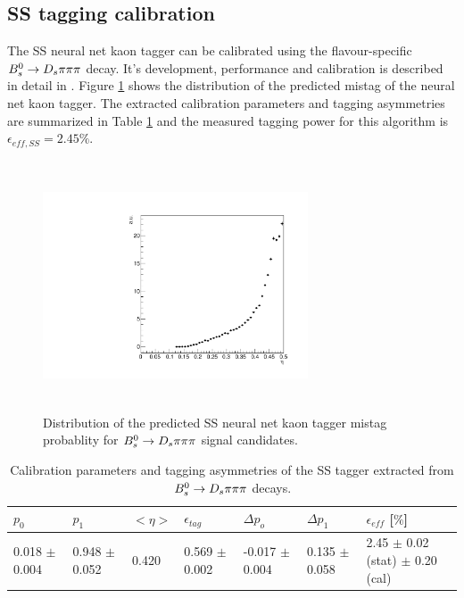 \subsection{SS tagging calibration}
\label{subsec: SScalibration}
The SS neural net kaon tagger can be calibrated using the flavour-specific ${{B}^0_{s}}\rightarrow{\ensuremath{{D}_{s}}}{\ensuremath{\pi}}{\ensuremath{\pi}}{\ensuremath{\pi}}$ decay. It's development, performance and calibration is described in detail in \cite{Aaij:2016psi}. 
Figure \ref{fig:SSdistribution} shows the distribution of the predicted mistag of the neural net kaon tagger. 
The extracted calibration parameters and tagging asymmetries are summarized in Table \ref{table: SScalibration} and the measured tagging power for this algorithm is $\epsilon_{eff,SS} = 2.45  \%$.


\begin{figure}[h]
\centering
\includegraphics[height=7.4cm,width=0.7\textwidth]{figs/Tagging/SS_nnetKaon_etaDis.pdf}
\caption{Distribution of the predicted SS neural net kaon tagger mistag probablity for ${{B}^0_{s}}\rightarrow{\ensuremath{{D}_{s}}}{\ensuremath{\pi}}{\ensuremath{\pi}}{\ensuremath{\pi}}$ signal candidates.}
\label{fig:SSdistribution}
\end{figure}


\begin{table}[h]
\centering
\scriptsize
 \begin{tabular}{l l l l | l l | l}
\hline
$p_{0}$ & $p_{1}$ & $<\eta>$ & $\epsilon_{tag}$ & $\Delta p_{o}$ & $\Delta p_{1}$ & $\epsilon_{eff}$ [$\%$] \\
\hline
0.018 $\pm$ 0.004  & 0.948 $\pm$ 0.052 & 0.420 & 0.569 $\pm$ 0.002 & -0.017 $\pm$ 0.004  & 0.135 $\pm$ 0.058 & 2.45 $\pm$ 0.02 (stat) $\pm$ 0.20 (cal) \\
\hline
\end{tabular}
\caption{Calibration parameters and tagging asymmetries of the SS tagger extracted from ${{B}^0_{s}}\rightarrow{\ensuremath{{D}_{s}}}{\ensuremath{\pi}}{\ensuremath{\pi}}{\ensuremath{\pi}}$ decays.}
\label{table: SScalibration}
\normalsize
\end{table}


